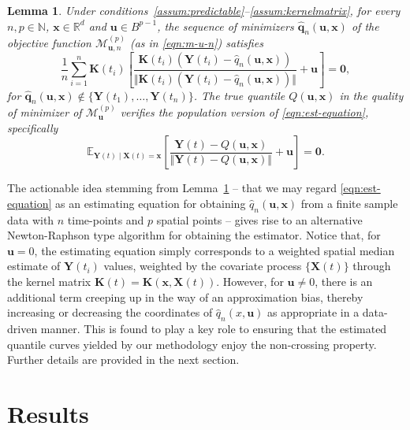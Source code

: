 \documentclass[aos]{imsart}
\theoremstyle{plain}
\newtheorem{lemma}[theorem]{Lemma}
\theoremstyle{remark}
\def\E{\mathbb{E}}
\def\R{\mathbb{R}}
\def\N{\mathbb{N}}
\newcommand{\Mcal}{\mathcal{M}}
\newcommand{\bb}[1]{\boldsymbol{#1}}
\newcommand{\kernel}[1]{\bb{K}(\bb{x}, \bb{X}(#1))}
\newcommand{\cnam}[1]{\textcolor{mypurple}{#1}}
\begin{document}
\begin{lemma}\label{lemma:estimating-eqn}
    Under conditions~\ref{assum:predictable}--\ref{assum:kernelmatrix}, for every $n, p \in \N$, $\bb{x} \in \R^d$ and $\bb{u} \in B^{p-1}$, the sequence of minimizers $\widehat{\bb{q}}_n(\bb{u}, \bb{x})$ of the objective function $\Mcal_{\bb{u},n}^{(p)}$ (as in \eqref{eqn:m-u-n}) satisfies
    \begin{equation}\label{eqn:est-equation}
        \frac{1}{n} \sum_{i=1}^n \bb{K}(t_i) \left[\dfrac{\bb{K}(t_i)(\bb{Y}(t_i) - \hat{q}_n(\bb{u} ,\bb{x}))  }{ \Vert \bb{K}(t_i)(\bb{Y}(t_i) - \hat{q}_n(\bb{u} ,\bb{x})) \Vert } + \bb{u}\right] = \bb{0},
    \end{equation}
    for $\widehat{\bb{q}}_n(\bb{u}, \bb{x}) \notin \{ \bb{Y}(t_1), \dots, \bb{Y}(t_n) \}$. The true quantile $Q(\bb{u} ,\bb{x})$ in the quality of minimizer of $\Mcal_{\bb{u}}^{(p)}$ verifies the population version of \eqref{eqn:est-equation}, specifically
    \begin{equation}
        \E_{\bb{Y}(t) \mid \bb{X}(t) = \bb{x}}\left[ \dfrac{\bb{Y}(t)- Q(\bb{u} ,\bb{x}) }{\Vert \bb{Y}(t) - Q(\bb{u} ,\bb{x}) \Vert } + \bb{u}\right] = \bb{0}.
        \label{eqn:est-equation-true}
    \end{equation}
\end{lemma}

\cnam{The actionable idea stemming from Lemma~\ref{lemma:estimating-eqn} -- that we may regard \eqref{eqn:est-equation} as an estimating equation for obtaining $\hat{q}_n(\bb{u} ,\bb{x})$ from a finite sample data with $n$ time-points and $p$ spatial points -- gives rise to} an alternative Newton-Raphson type algorithm for obtaining the estimator. Notice that, for $\bb{u} = 0$, the estimating equation simply corresponds to a weighted spatial median estimate of $\bb{Y}(t_i)$ values, weighted by the covariate process $\{\bb{X}(t)\}$ through the kernel matrix \cnam{$\bb{K}(t)=\kernel{t}$}. However, for $\bb{u} \neq 0$, there is \cnam{an additional term creeping up in the way of an approximation bias, thereby increasing or decreasing the coordinates of $\hat{q}_n(x, \bb{u})$ as appropriate in a data-driven manner. This is found to play a key role to ensuring that the estimated quantile curves yielded by our methodology enjoy the non-crossing property. Further details are provided in the next section.} 


\section{Results}
\label{Sec:Asymptotics}
\end{document}

